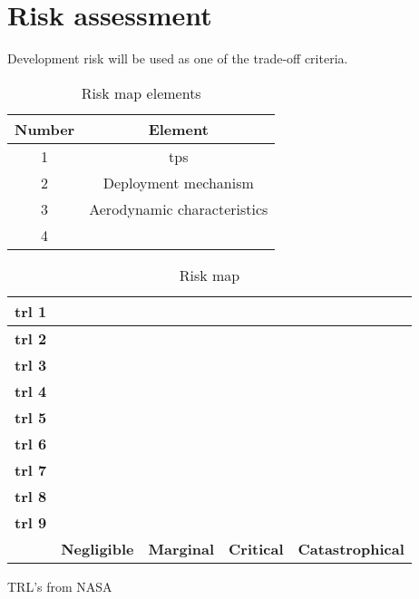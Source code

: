\section{Risk assessment}
\label{ch:riskestimation}
Development risk will be used as one of the trade-off criteria. 

\begin{table}[h]
	\centering
	\caption{Risk map elements}
	\label{tab:riskmapelements}
	\begin{tabular}{|c|c|}
		\hline 
		\textbf{Number} & \textbf{Element} \\ \hline \hline
		1 & \acrlong{tps} \\
		2 & Deployment mechanism \\
		3 & Aerodynamic characteristics \\
		4 & \\
		\hline
	\end{tabular}
\end{table}

\begin{table}[H]
	\caption{Risk map}
	\label{tab:riskmap}
	\begin{tabular}{|c|c|c|c|c|} %
		\hline
		\textbf{\gls{trl} 1} & \cellcolor{green} & \cellcolor{yellow} & \cellcolor{red} & \cellcolor{red} \\ \hline
		\textbf{\gls{trl} 2} & \cellcolor{green} & \cellcolor{yellow} & \cellcolor{red} & \cellcolor{red} \\ \hline
		\textbf{\gls{trl} 3} & \cellcolor{green} & \cellcolor{yellow} & \cellcolor{red} & \cellcolor{red} \\ \hline
		\textbf{\gls{trl} 4} & \cellcolor{green} & \cellcolor{yellow} & \cellcolor{yellow} & \cellcolor{yellow} \\ \hline
		\textbf{\gls{trl} 5} & \cellcolor{green} & \cellcolor{green} & \cellcolor{yellow} & \cellcolor{yellow} \\ \hline
		\textbf{\gls{trl} 6} & \cellcolor{green} & \cellcolor{green} & \cellcolor{green} & \cellcolor{green} \\ \hline
		\textbf{\gls{trl} 7} & \cellcolor{green} & \cellcolor{green} & \cellcolor{green} & \cellcolor{green} \\ \hline
		\textbf{\gls{trl} 8} & \cellcolor{green} & \cellcolor{green} & \cellcolor{green} & \cellcolor{green} \\ \hline
		\textbf{\gls{trl} 9} & \cellcolor{green} & \cellcolor{green} & \cellcolor{green} & \cellcolor{green} \\ \hline
		 & \textbf{Negligible} & \textbf{Marginal} & \textbf{Critical} & \textbf{Catastrophical} \\ \hline
	\end{tabular}
\end{table}
TRL's from NASA \cite{NationalAeronauticsandSpaceAdministration2007}

